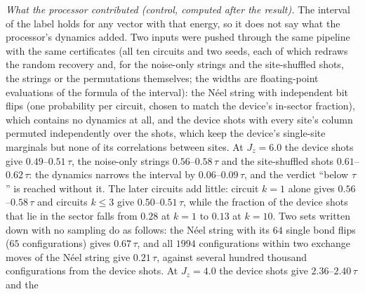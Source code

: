 \documentclass[aps,prx,onecolumn,10pt,nofootinbib,longbibliography,floatfix]{revtex4-2}
\theoremstyle{remark}
\newcommand{\Jz}{J_z}
\begin{document}
\emph{What the processor contributed (control, computed after the result).} The interval of the label holds for any
vector with that energy, so it does not say what the processor's dynamics added. Two inputs were pushed through the
same pipeline with the same certificates (all ten circuits and two seeds, each of which redraws the random recovery and, for the
noise-only strings and the site-shuffled shots, the strings or the permutations themselves; the widths are
floating-point evaluations of the formula of the interval): the N\'eel string with independent bit flips (one probability per
circuit, chosen to match the device's in-sector fraction), which contains no dynamics at all, and the device shots
with every site's column permuted independently over the shots, which keep the device's single-site marginals but
none of its correlations between sites. At $\Jz=6.0$ the device shots give $0.49$--$0.51\,\tau$, the noise-only strings %
$0.56$--$0.58\,\tau$ and the site-shuffled shots $0.61$--$0.62\,\tau$: the dynamics narrows the interval by %
$0.06$--$0.09\,\tau$, and the verdict ``below $\tau$'' is reached without it. The later circuits add little: %
circuit $k=1$ alone gives $0.56$--$0.58\,\tau$ and circuits $k\le3$ give $0.50$--$0.51\,\tau$, while the fraction of the %
device shots that lie in the sector falls from $0.28$ at $k=1$ to $0.13$ at $k=10$. Two sets written %
down with no sampling do as follows: the N\'eel string with its $64$ single bond flips ($65$ configurations) gives %
$0.67\,\tau$, and all $1994$ configurations within two exchange moves of the N\'eel string give $0.21\,\tau$, %
against several hundred thousand configurations from the device shots. At $\Jz=4.0$ the device shots give $2.36$--$2.40\,\tau$ and the %
\end{document}
